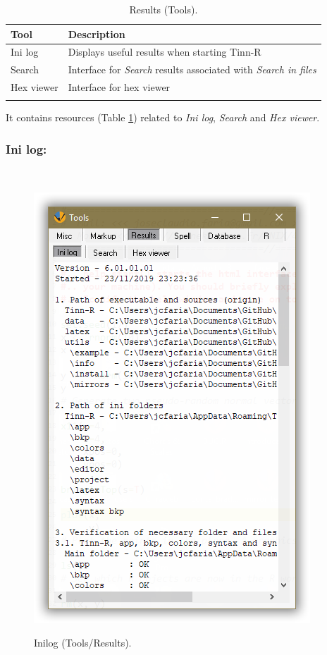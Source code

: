 \begin{table}
  \begin{footnotesize}
    \begin{tabularx}{\textwidth}{>{\hsize=0.3\hsize}X>{\hsize=0.7\hsize}X}\\
      \hline
      \textbf{Tool} & \textbf{Description} \\
      \hline
      Ini log & Displays useful results when starting Tinn-R \\
      Search & Interface for \textit{Search} results associated with \textit{Search in files} \\
      Hex viewer & Interface for hex viewer \\
      \hline
      \\
    \end{tabularx}
  \end{footnotesize}
  \caption{Results (Tools).}
  \label{tab:tools_results}
\end{table}

It contains resources
(Table \ref{tab:tools_results})
related to \textit{Ini log}, \textit{Search} and \textit{Hex viewer}.


\subsubsection{Ini log:}
\\

\begin{figure}[H]
  \includegraphics[scale=0.35]{./res/tools_results_inilog.png}\\
  \caption{Inilog (Tools/Results).}
  \label{fig:tools_results_inilog}
\end{figure}

